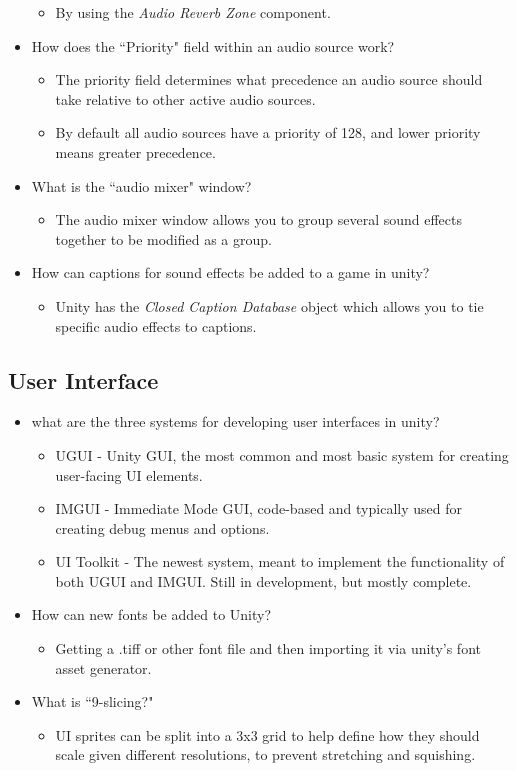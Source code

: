 \documentclass{article}
\begin{document}
\begin{itemize}
\begin{itemize}
        \item By using the \textit{Audio Reverb Zone} component.
    \end{itemize}
    \item How does the ``Priority" field within an audio source work?
    \begin{itemize}
        \item The priority field determines what precedence an audio source should take relative to other active audio sources.
        \item By default all audio sources have a priority of 128, and lower priority means greater precedence.
    \end{itemize}
    \item What is the ``audio mixer" window?
    \begin{itemize}
        \item The audio mixer window allows you to group several sound effects together to be modified as a group.
    \end{itemize}
    \item How can captions for sound effects be added to a game in unity?
    \begin{itemize}
        \item Unity has the \textit{Closed Caption Database} object which allows you to tie specific audio effects to captions.
    \end{itemize}
\end{itemize}

\subsection{User Interface}
\begin{itemize}
    \item what are the three systems for developing user interfaces in unity?
    \begin{itemize}
        \item UGUI - Unity GUI, the most common and most basic system for creating user-facing UI elements.
        \item IMGUI - Immediate Mode GUI, code-based and typically used for creating debug menus and options.
        \item UI Toolkit - The newest system, meant to implement the functionality of both UGUI and IMGUI. Still in development, but mostly complete.
    \end{itemize}
    \item How can new fonts be added to Unity?
    \begin{itemize}
        \item Getting a .tiff or other font file and then importing it via unity's font asset generator.
    \end{itemize}
    \item What is ``9-slicing?"
    \begin{itemize}
        \item UI sprites can be split into a 3x3 grid to help define how they should scale given different resolutions, to prevent stretching and squishing.
    \end{itemize}
\end{itemize}
\end{document}
